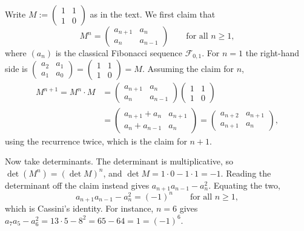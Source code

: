 \begin{exercisesolution}
\label{sol:ch1_list_f}

Write $M := \left(\begin{smallmatrix} 1 & 1 \\ 1 & 0 \end{smallmatrix}\right)$ as in the text. We first claim that
\[
    M^n = \begin{pmatrix} a_{n+1} & a_n \\ a_n & a_{n-1} \end{pmatrix} \qquad \text{for all } n \ge 1,
\]
where $(a_n)$ is the classical Fibonacci sequence $\mathcal{F}_{0,1}$. For $n = 1$ the right-hand side is $\left(\begin{smallmatrix} a_2 & a_1 \\ a_1 & a_0 \end{smallmatrix}\right) = \left(\begin{smallmatrix} 1 & 1 \\ 1 & 0 \end{smallmatrix}\right) = M$. Assuming the claim for $n$,
\begin{align*}
    M^{n+1} = M^n \cdot M
    &= \begin{pmatrix} a_{n+1} & a_n \\ a_n & a_{n-1} \end{pmatrix} \begin{pmatrix} 1 & 1 \\ 1 & 0 \end{pmatrix} \\
    &= \begin{pmatrix} a_{n+1} + a_n & a_{n+1} \\ a_n + a_{n-1} & a_n \end{pmatrix}
     = \begin{pmatrix} a_{n+2} & a_{n+1} \\ a_{n+1} & a_n \end{pmatrix},
\end{align*}
using the recurrence twice, which is the claim for $n+1$.

Now take determinants. The determinant is multiplicative, so $\det(M^n) = (\det M)^n$, and $\det M = 1 \cdot 0 - 1 \cdot 1 = -1$. Reading the determinant off the claim instead gives $a_{n+1} a_{n-1} - a_n^2$. Equating the two,
\[
    a_{n+1} a_{n-1} - a_n^2 = (-1)^n \qquad \text{for all } n \ge 1,
\]
which is Cassini's identity. For instance, $n = 6$ gives $a_7 a_5 - a_6^2 = 13 \cdot 5 - 8^2 = 65 - 64 = 1 = (-1)^6$.
\end{exercisesolution}

